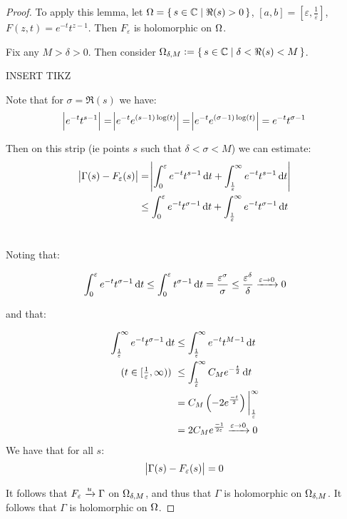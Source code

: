 \begin{proof}
To apply this lemma, let $\Omega = \set{ s \in \mathbb{C}\mid \Re(s) > 0}$, $[a,b] = [\varepsilon, \frac{1}{\varepsilon} ]$, $F(z,t) = e^{-t} t^{z-1} $. Then $F_\varepsilon$ is holomorphic on $\Omega$.

Fix any $M > \delta >0$. Then consider $\Omega_{\delta, M} \vcentcolon = \set{s \in \mathbb{C}\mid \delta < \Re(s) < M}$.

INSERT TIKZ


Note that for $\sigma = \Re (s)$ we have:
\begin{align*}
    \abs{e^{-t}t^{s-1}} = \abs{e^{-t}e^{(s-1) \log(t)}} = \abs{e^{-t}e^{(\sigma-1) \log(t)}} = e^{-t}t^{\sigma-1}
\end{align*}

Then on this strip (ie points $s$ such that $\delta < \sigma < M$) we can estimate:
\begin{align*}
    \abs{\Gamma(s) - F_\varepsilon(s)} &= \abs{\int_0^\varepsilon e^{-t} t^{s-1} \dif t + \int_\frac{1}{\varepsilon}^\infty e^{-t} t^{s-1} \dif t}\\
    & \leq \int_0^\varepsilon e^{-t} t^{\sigma-1} \dif t + \int_\frac{1}{\varepsilon}^\infty e^{-t} t^{\sigma-1} \dif t\\
    &
\end{align*}

Noting that:

\begin{align*}
    \int_0^\varepsilon e^{-t} t^{\sigma-1} \dif t \leq \int_0^\varepsilon t^{\sigma-1} \dif t = \frac{\varepsilon^\sigma}{\sigma} \leq \frac{\varepsilon^\delta}{\delta} \xrightarrow[]{\varepsilon \to 0} 0
\end{align*}

and that:

\begin{align*}
    \int_\frac{1}{\varepsilon}^\infty e^{-t} t^{\sigma-1} \dif t &\leq \int_\frac{1}{\varepsilon}^\infty e^{-t} t^{M-1} \dif t\\
    \text{($t\in [\tfrac{1}{\varepsilon}, \infty)$) } &\leq \int_\frac{1}{\varepsilon}^\infty C_M e^{-\frac{t}{2}} \dif t\\
    &= C_M \br{-2 e^{\frac{-t}{2}}} \bigg|_\frac{1}{\varepsilon}^\infty\\
    &= 2C_M e^{\frac{-1}{2\varepsilon}} \xrightarrow[]{\varepsilon \to 0} 0
\end{align*}
We have that for all $s$:
\begin{align*}
    \abs{\Gamma(s) - F_\varepsilon(s)} = 0
\end{align*}

It follows that $F_\varepsilon \xrightarrow[]{u} \Gamma$ on $\Omega_{\delta, M}$, and thus that $\Gamma $ is holomorphic on $\Omega_{\delta, M}$. It follows that $\Gamma$ is holomorphic on $\Omega$.
\end{proof}


